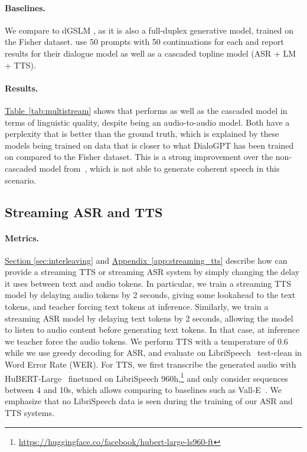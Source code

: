 \paragraph{Baselines.} We compare to dGSLM \citep{nguyen-etal-2023-generative}, as it is also a full-duplex generative model, trained on the Fisher dataset. \citet{nguyen-etal-2023-generative} use 50 prompts with 50 continuations for each and report results for their dialogue model as well as a cascaded topline model (ASR + LM + TTS).

\paragraph{Results.} \hyperref[tab:multistream]{Table~\ref{tab:multistream}} shows that \ours{} performs as well as the cascaded model in terms of linguistic quality, despite being an audio-to-audio model. Both have a perplexity that
is better than the ground truth, which is explained by these models being trained on data
that is closer to what DialoGPT has been trained on compared to the Fisher dataset. This is a strong improvement over the non-cascaded model from~\citep{nguyen-etal-2023-generative}, which is not able to generate coherent speech in this scenario.

\subsection{Streaming ASR and TTS}
\label{sec:streaming_asr_tts}
\paragraph{Metrics.} \hyperref[sec:interleaving]{Section \ref{sec:interleaving}} and \hyperref[app:streaming_tts]{Appendix~\ref{app:streaming_tts}} describe how \interleaving{} can provide a streaming TTS or streaming ASR system by simply changing the delay it uses between text and audio tokens. In particular, we train a streaming TTS model by delaying audio tokens by 2 seconds, giving some lookahead to the text tokens, and teacher forcing text tokens at inference. Similarly, we train a streaming ASR model by delaying text tokens by 2 seconds, allowing the model to listen to audio content before generating text tokens. In that case, at inference we teacher force the audio tokens. We perform TTS with a temperature of 0.6 while we use greedy decoding for ASR, and evaluate on LibriSpeech~\citep{librispeech} test-clean in Word Error Rate (WER). For TTS, we first transcribe the generated audio with HuBERT-Large~\citep{hubert} finetuned on LibriSpeech 960h,\footnote{\url{https://huggingface.co/facebook/hubert-large-ls960-ft}} and only consider sequences between 4 and 10s, which allows comparing to baselines such as Vall-E~\citep{valle}. We emphasize that no LibriSpeech data is seen during the training of our ASR and TTS systems.

